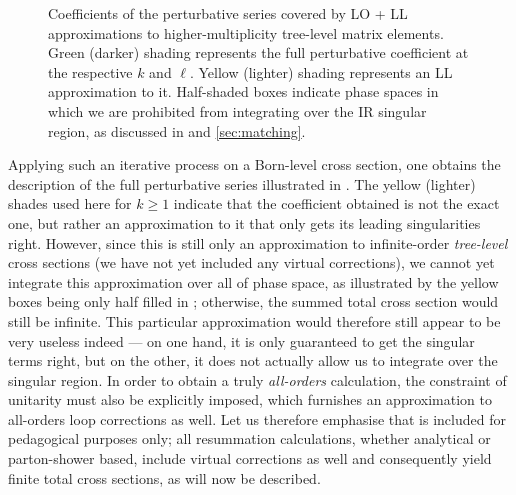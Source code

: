 \begin{figure}
\centering
{}
\caption{Coefficients of the perturbative series covered by LO + LL 
  approximations to higher-multiplicity tree-level matrix elements.
Green (darker) shading represents the full perturbative
  coefficient at the respective $k$ and $\ell$. Yellow (lighter)
  shading represents an LL approximation to it. Half-shaded boxes
  indicate phase spaces in which we are prohibited from integrating
  over the IR singular region, as discussed in
   and \ref{sec:matching}.
\label{fig:LL}}
\end{figure}
Applying such an iterative process on a Born-level cross section, one
obtains the description of the full perturbative series illustrated in
. The yellow (lighter) shades
used here for $k\ge 
1$ indicate that the coefficient obtained is not the exact one, but rather an 
approximation to it that only gets its leading singularities
right. However, since this is still only an approximation to
infinite-order \emph{tree-level} cross sections 
(we have not yet included any virtual corrections), 
we cannot yet integrate this approximation over all of
phase space, as illustrated by the yellow boxes being only
half filled in ; otherwise, the summed total cross section
would still be infinite. This particular approximation would therefore
still appear to be  
very useless indeed --- on one hand, 
it is only guaranteed to get the singular terms right, but on the
other, it does not actually allow us to  integrate over the singular
region. In order to obtain a truly \emph{all-orders} calculation, the
constraint of unitarity must also be explicitly imposed, which
furnishes an approximation to all-orders loop corrections as well.
Let us therefore emphasise that  is included for
pedagogical purposes only; all resummation calculations, whether
analytical or parton-shower based, include virtual corrections as well
and consequently yield finite total cross sections, as will now be described.

